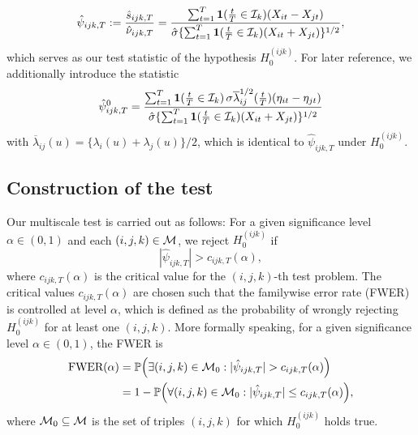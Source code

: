 \documentclass[a4paper,12pt]{article}
\numberwithin{equation}{section}
\begin{document}
\begin{equation}\label{eq:stat}
\hat{\psi}_{ijk,T} := \frac{\hat{s}_{ijk,T}}{\hat{\nu}_{ijk,T}} = \frac{\sum\nolimits_{t=1}^T \boldsymbol{1}(\frac{t}{T} \in \mathcal{I}_k) (X_{it} - X_{jt})}{ \hat{\sigma} \{ \sum\nolimits_{t=1}^T \boldsymbol{1}(\frac{t}{T} \in \mathcal{I}_k) (X_{it} + X_{jt}) \}^{1/2}}, 
\end{equation}
which serves as our test statistic of the hypothesis $H_0^{(ijk)}$. For later reference, we additionally introduce the statistic 
\begin{equation}\label{eq:stat0}
\hat{\psi}_{ijk,T}^0 = \frac{\sum\nolimits_{t=1}^T \boldsymbol{1}(\frac{t}{T} \in \mathcal{I}_k) \, \sigma \overline{\lambda}_{ij}^{1/2}(\frac{t}{T}) (\eta_{it} - \eta_{jt})}{ \hat{\sigma} \{ \sum\nolimits_{t=1}^T \boldsymbol{1}(\frac{t}{T} \in \mathcal{I}_k) (X_{it} + X_{jt}) \}^{1/2}}
\end{equation}
with $\overline{\lambda}_{ij}(u) = \{ \lambda_i(u) + \lambda_j(u) \}/2$, which is identical to $\hat{\psi}_{ijk,T}$ under $H_0^{(ijk)}$. 


\subsection{Construction of the test} 


Our multiscale test is carried out as follows: For a given significance level $\alpha \in (0,1)$ and each $(i,j,k) \in \mathcal{M}$, we reject $H_0^{(ijk)}$ if 
\[ |\hat{\psi}_{ijk,T}| > c_{ijk,T}(\alpha), \]
where $c_{ijk,T}(\alpha)$ is the critical value for the $(i,j,k)$-th test problem. The critical values $c_{ijk,T}(\alpha)$ are chosen such that the familywise error rate (FWER) is controlled at level $\alpha$, which is defined as the probability of wrongly rejecting $H_0^{(ijk)}$ for at least one $(i,j,k)$. More formally speaking, for a given significance level $\alpha \in (0,1)$, the FWER is 
\begin{align*}
\text{FWER}(\alpha) 
 & = \mathbb{P} \Big( \exists (i,j,k) \in \mathcal{M}_0: |\hat{\psi}_{ijk,T}| > c_{ijk,T}(\alpha) \Big) \\
 & =  1 - \mathbb{P} \Big( \forall (i,j,k) \in \mathcal{M}_0: |\hat{\psi}_{ijk,T}| \le c_{ijk,T}(\alpha) \Big), 
\end{align*}
where $\mathcal{M}_0 \subseteq \mathcal{M}$ is the set of triples $(i,j,k)$ for which $H_0^{(ijk)}$ holds true.  
\end{document}
